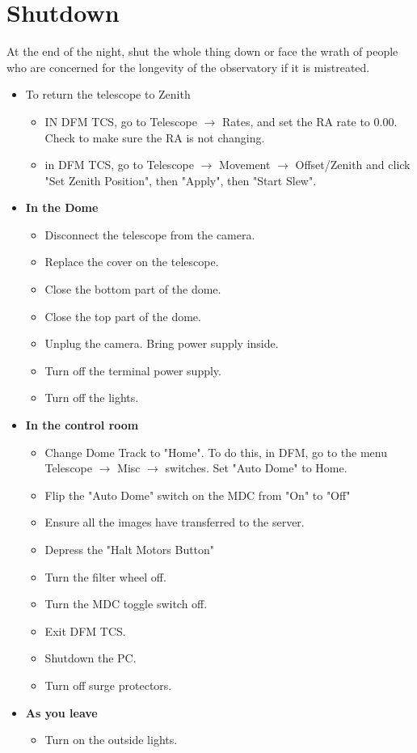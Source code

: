 \documentclass[letterpaper, 12pt]{report}
\begin{document}
\chapter{Shutdown}\label{ch:7}
At the end of the night, shut the whole thing down or face the wrath of people who are concerned for the longevity of the observatory if it is mistreated.
\begin{itemize}
	\item To return the telescope to Zenith
	\begin{itemize}
		\item IN DFM TCS, go to Telescope $\rightarrow$ Rates, and set the RA rate to 0.00. Check to make sure the RA is not changing.
		\item in DFM TCS, go to Telescope $\rightarrow$ Movement $\rightarrow$ Offset/Zenith and click "Set Zenith Position", then "Apply", then "Start Slew".
	\end{itemize} 
\end{itemize}
\begin{itemize}
	\item \large \textbf{In the Dome}
	\begin{itemize}
	\item Disconnect the telescope from the camera.
	\item Replace the cover on the telescope.
	\item Close the bottom part of the dome.
	\item Close the top part of the dome.
	\item Unplug the camera. Bring power supply inside.
	\item Turn off the terminal power supply.
	\item Turn off the lights.	
	\end{itemize}

	\item \large \textbf{In the control room}
	\begin{itemize}
		\item Change Dome Track to "Home". To do this, in DFM, go to the menu Telescope $\rightarrow$ Misc $\rightarrow$ switches. Set "Auto Dome" to Home.
		\item Flip the "Auto Dome" switch on the MDC from "On" to "Off"
		\item Ensure all the images have transferred to the server.
		\item Depress the "Halt Motors Button"
		\item Turn the filter wheel off.
		\item Turn the MDC toggle switch off.
		\item Exit DFM TCS.
		\item Shutdown the PC. 
		\item Turn off surge protectors.
	\end{itemize}
	
\item \large \textbf{As you leave}
\begin{itemize}
	\item Turn on the outside lights. 
\end{itemize}
\end{itemize}
\newpage
\end{document}

